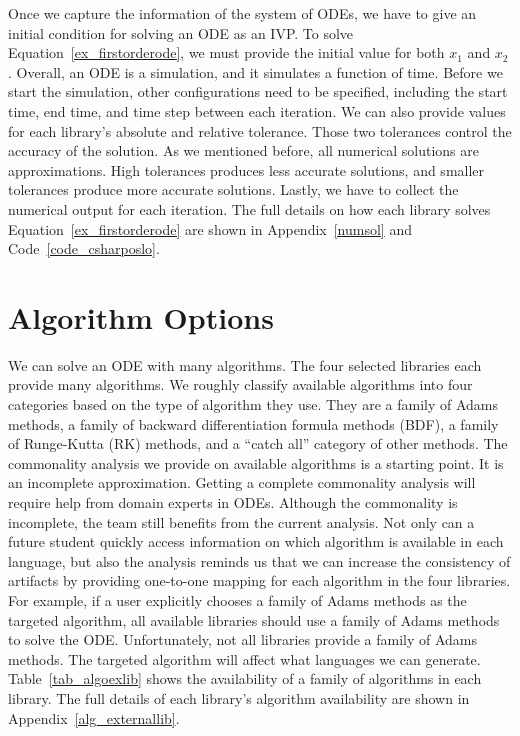 Once we capture the information of the system of ODEs, we have to give an initial condition for solving an ODE as an IVP. To solve Equation~\ref{ex_firstorderode}, we must provide the initial value for both $x_1$ and $x_2$. Overall, an ODE is a simulation, and it simulates a function of time. Before we start the simulation, other configurations need to be specified, including the start time, end time, and time step between each iteration. We can also provide values for each library's absolute and relative tolerance. Those two tolerances control the accuracy of the solution. As we mentioned before, all numerical solutions are approximations. High tolerances produces less accurate solutions, and smaller tolerances produce more accurate solutions. Lastly, we have to collect the numerical output for each iteration. The full details on how each library solves Equation~\ref{ex_firstorderode} are shown in Appendix~\ref{numsol} and Code~\ref{code_csharposlo}.

\section{Algorithm Options}
\label{se_algorithmoptiopns}
We can solve an ODE with many algorithms. The four selected libraries each provide many algorithms. We roughly classify available algorithms into four categories based on the type of algorithm they use. They are a family of Adams methods, a family of backward differentiation formula methods (BDF), a family of Runge-Kutta (RK) methods, and a ``catch all'' category of other methods. The commonality analysis we provide on available algorithms is a starting point. It is an incomplete approximation. Getting a complete commonality analysis will require help from domain experts in ODEs. Although the commonality is incomplete, the team still benefits from the current analysis. Not only can a future student quickly access information on which algorithm is available in each language, but also the analysis reminds us that we can increase the consistency of artifacts by providing one-to-one mapping for each algorithm in the four libraries. For example, if a user explicitly chooses a family of Adams methods as the targeted algorithm, all available libraries should use a family of Adams methods to solve the ODE. Unfortunately, not all libraries provide a family of Adams methods. The targeted algorithm will affect what languages we can generate. Table~\ref{tab_algoexlib} shows the availability of a family of algorithms in each library. The full details of each library's algorithm availability are shown in Appendix~\ref{alg_externallib}.

